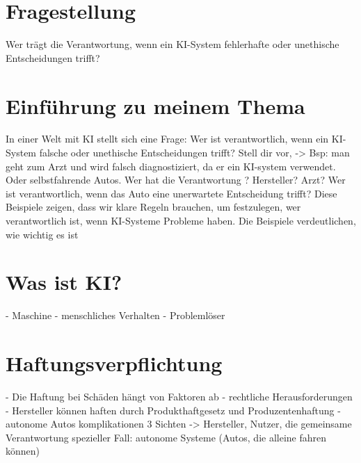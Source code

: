 \documentclass{article}
\begin{document}
\section {Fragestellung} 
    Wer trägt die Verantwortung, wenn ein KI-System fehlerhafte oder unethische Entscheidungen trifft?

\section {Einführung zu meinem Thema}
In einer Welt mit KI stellt sich eine Frage: Wer ist verantwortlich, 
wenn ein KI-System falsche oder unethische Entscheidungen trifft? 
Stell dir vor, -> Bsp: man geht zum Arzt und wird falsch diagnostiziert, da er ein KI-system verwendet.
 Oder selbstfahrende Autos.
 Wer hat die Verantwortung ? Hersteller? Arzt? 
 Wer ist verantwortlich, wenn das Auto eine unerwartete
 Entscheidung trifft? Diese Beispiele zeigen, dass wir klare Regeln brauchen, um festzulegen, wer verantwortlich ist, wenn KI-Systeme Probleme haben. 
 Die Beispiele verdeutlichen, wie wichtig es ist

\section {Was ist KI?}
- Maschine
- menschliches Verhalten
- Problemlöser

\section {Haftungsverpflichtung}
- Die Haftung bei Schäden hängt von Faktoren ab
- rechtliche Herausforderungen
- Hersteller können haften durch Produkthaftgesetz und Produzentenhaftung
- autonome Autos komplikationen
3 Sichten -> Hersteller, Nutzer, die gemeinsame Verantwortung
spezieller Fall: autonome Systeme (Autos, die alleine fahren können)

\end{document}
